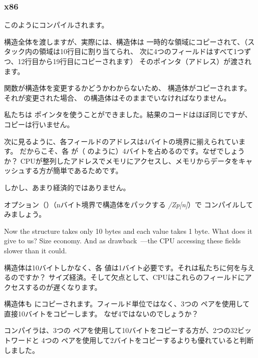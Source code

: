 ﻿\subsubsection{x86}

このようにコンパイルされます。



構造全体を渡しますが、実際には、構造体は
一時的な領域にコピーされて、（スタック内の領域は10行目に割り当てられ、
次に4つのフィールドはすべて1つずつ、12行目から19行目にコピーされます）
そのポインタ（アドレス）が渡されます。

\ttf{} 関数が構造体を変更するかどうかわからないため、
構造体がコピーされます。 
それが変更された場合、 \main の構造体はそのままでいなければなりません。

私たちは \CCpp ポインタを使うことができました。結果のコードはほぼ同じですが、
コピーは行いません。

次に見るように、各フィールドのアドレスは4バイトの境界に揃えられています。 
だからこそ、各 \Tchar が（ \Tint のように）4バイトを占めるのです。なぜでしょうか？ 
CPUが整列したアドレスでメモリにアクセスし、メモリからデータをキャッシュする方が簡単であるためです。

しかし、あまり経済的ではありません。

オプション（）（nバイト境界で構造体をパックする \emph{/Zp[n]}）で
コンパイルしてみましょう。



Now the structure takes only 10 bytes and each \Tchar value takes 1 byte. What does it give to us?
Size economy. And as drawback~---the CPU accessing these fields slower than it could.

構造体は10バイトしかなく、各 \Tchar 値は1バイト必要です。それは私たちに何を与えるのですか？
サイズ経済。そして欠点として、CPUはこれらのフィールドにアクセスするのが遅くなります。

\label{short_struct_copying_using_MOV}

構造体も \main にコピーされます。フィールド単位ではなく、3つの \MOV ペアを使用して直接10バイトをコピーします。
なぜ4ではないのでしょうか？

コンパイラは、3つの \MOV ペアを使用して10バイトをコピーする方が、2つの32ビットワードと
4つの \MOV ペアを使用して2バイトをコピーするよりも優れていると判断しました。

